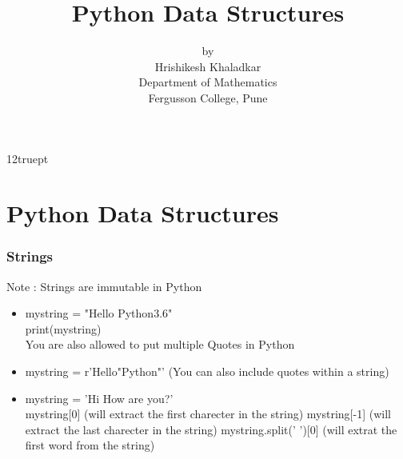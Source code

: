\documentclass{beamer}
\theoremstyle{plain}
\theoremstyle{definition}
\begin{document}
\baselineskip 12truept
\title{Python Data Structures}
\author[Hrishikesh Khaladkar,Fergusson College, Pune]{by\\Hrishikesh Khaladkar\\Department of Mathematics \\ Fergusson College, Pune}
\vspace{0.5cm} 
\frame{\titlepage}
\section{Python Data Structures}
\begin{frame}
      \frametitle{Strings}
      Note : Strings are immutable in Python
			\begin{itemize}
			\item  mystring = "Hello Python3.6" \\
                   print(mystring) \\
                   You are also allowed to put multiple Quotes in Python \\
            \item  mystring = r'Hello"Python"'
            (You can also include quotes within a string)
            \item mystring = 'Hi How are you?'\\
             mystring[0]  (will extract the first charecter in the string)
			 mystring[-1]  (will extract the last charecter in the string)
			 mystring.split(' ')[0] (will extrat the first word from the string)
			\end{itemize}


\end{frame}
\end{document}
